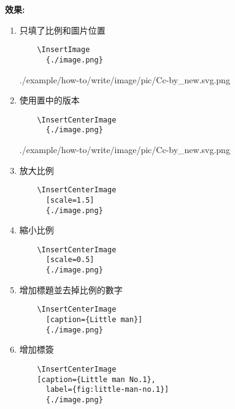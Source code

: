   \newpage
  {\bf 效果:}
  \begin{enumerate}
  \item
  {
    只填了比例和圖片位置
    \begin{verbatim}
    \InsertImage
      {./image.png}
    \end{verbatim}
    \InsertImage
    {./example/how-to/write/image/pic/Cc-by_new.svg.png}
  } %

  \item
  {
    使用置中的版本
    \begin{verbatim}
    \InsertCenterImage
      {./image.png}
    \end{verbatim}
    \InsertCenterImage
    {./example/how-to/write/image/pic/Cc-by_new.svg.png}
  } %

  \item
  {
    放大比例
    \begin{verbatim}
    \InsertCenterImage
      [scale=1.5]
      {./image.png}
    \end{verbatim}
  } %

  \newpage

  \item
  {
    縮小比例
    \begin{verbatim}
    \InsertCenterImage
      [scale=0.5]
      {./image.png}
    \end{verbatim}
  } %

  \item
  {
    增加標題並去掉比例的數字
    \begin{verbatim}
    \InsertCenterImage
      [caption={Little man}]
      {./image.png}
    \end{verbatim}
  } %

  \newpage
  \item
  {
    增加標簽
    \begin{verbatim}
    \InsertCenterImage
    [caption={Little man No.1},
      label={fig:little-man-no.1}]
      {./image.png}
    \end{verbatim}

}
\end{enumerate}
